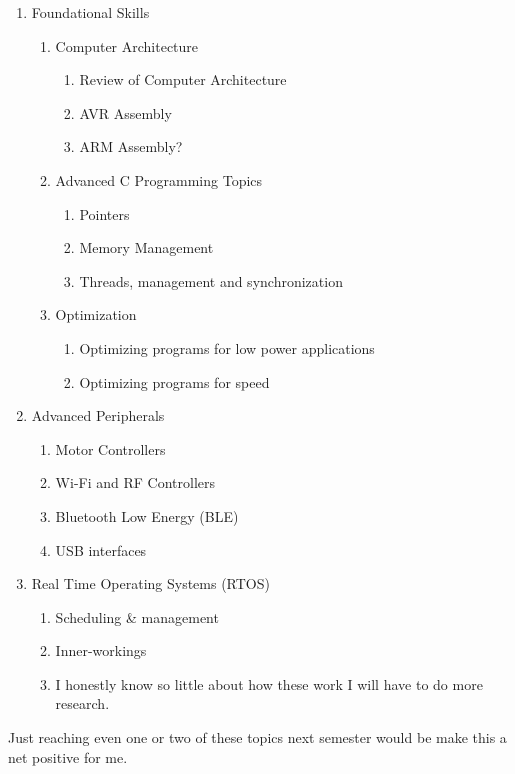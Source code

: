 \documentclass[12pt,a4paper,oneside,notitlepage]{article}
\begin{document}
\begin{enumerate}
	\item Foundational Skills
		\begin{enumerate}
			\item Computer Architecture
				\begin{enumerate}
					\item Review of Computer Architecture
					\item AVR Assembly
					\item ARM Assembly?
				\end{enumerate}
			\item Advanced C Programming Topics
				\begin{enumerate}
					\item Pointers
					\item Memory Management
					\item Threads, management and synchronization
				\end{enumerate}
			\item Optimization
				\begin{enumerate}
					\item Optimizing programs for low power applications
					\item Optimizing programs for speed
				\end{enumerate}
		\end{enumerate}
	\item Advanced Peripherals
		\begin{enumerate}
			\item Motor Controllers
			\item Wi-Fi and RF Controllers
			\item Bluetooth Low Energy (BLE)
			\item USB interfaces
		\end{enumerate}
	\item Real Time Operating Systems (RTOS)
		\begin{enumerate}
			\item Scheduling \& management
			\item Inner-workings 
			\item I honestly know so little about how these work I will have to do more research.
		\end{enumerate}
\end{enumerate}

Just reaching even one or two of these topics next semester would be make this a net positive for me.
\end{document}
